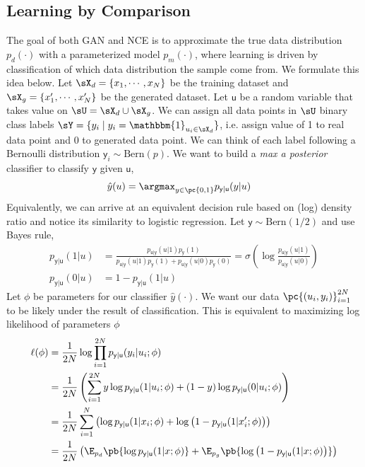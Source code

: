 \documentclass[11pt]{article}
\newcommand\ry{\ensuremath{\mathsf{y}}}
\newcommand\ru{\ensuremath{\mathsf{u}}}
\begin{document}
\subsection{Learning by Comparison}

The goal of both GAN and NCE is to approximate the true data distribution $p_d(\cdot)$ with a parameterized model $p_m(\cdot)$, where learning is driven by classification of which data distribution the sample come from. We formulate this idea below. Let $\sX_d = \{x_1,\cdots,x_N\}$ be the training dataset and $\sX_g = \{x_1',\cdots,x_N'\}$ be the generated dataset. Let $\ru$ be a random variable that takes value on $\sU = \sX_d\cup \sX_g$. We can assign all data points in $\sU$ binary class labels $\sY = \{y_i \mid y_i = \mathbbm{1}_{u_i\in \sX_d} \}$, i.e. assign value of 1 to real data point and 0 to generated data point. We can think of each label following a Bernoulli distribution $\ry_i\sim\text{Bern}(p)$. We want to build a \textit{max a posterior} classifier to classify $\ry$ given $\ru$,
\begin{align*}
    \hat{y}(u) 
        &= \argmax_{y\in\pc{0,1}} p_{\ry|\ru}(y|u)
\end{align*}
Equivalently, we can arrive at an equivalent decision rule based on (log) density ratio and notice its similarity to logistic regression. Let $\ry\sim\text{Bern}(1/2)$ and use Bayes rule,
\begin{align*}
    p_{\ry|\ru}(1|u)
        &= \frac{ p_{\ru|\ry}(u|1)p_{\ry}(1) }{ p_{\ru|\ry}(u|1)p_{\ry}(1) + p_{\ru|\ry}(u|0)p_{\ry}(0) } 
        = \sigma\left(
            \log \frac{ p_{\ru|\ry}(u|1) }{ p_{\ru|\ry}(u|0) }
        \right) \\
    p_{\ry|\ru}(0|u)
        &= 1 - p_{\ry|\ru}(1|u)
\end{align*}
Let $\phi$ be parameters for our classifier $\hat{y}(\cdot)$. We want our data $\pc{(u_i,y_i)}_{i=1}^{2N}$ to be likely under the result of classification. This is equivalent to maximizing log likelihood of parameters $\phi$
\begin{align}
    \label{eq:1}
    \ell(\phi)
        &= \frac{1}{2N} \log \prod_{i=1}^{2N} p_{\ry|\ru}(y_i|u_i;\phi) \notag \\
        &= \frac{1}{2N} \left( \sum_{i=1}^{2N} y\log p_{\ry|\ru}(1|u_i;\phi) + (1-y) \log p_{\ry|\ru}(0|u_i;\phi) \right) \notag\\
        &= \frac{1}{2N} \sum_{i=1}^{N} \left(  \log p_{\ry|\ru}(1|x_i;\phi) + \log \left( 1- p_{\ry|\ru}(1|x_i';\phi) \right)  \right) \notag\\
        &= \frac{1}{2N} \left( \E_{p_d}\pb{ \log p_{\ry|\ru}(1|x;\phi) } +  \E_{p_g}\pb{ \log \left( 1- p_{\ry|\ru}(1|x;\phi) \right) } \right)
\end{align}
\end{document}
